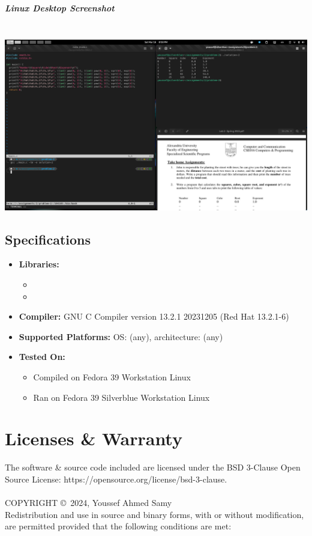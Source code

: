 \documentclass[a4paper,11pt]{article}
\theoremstyle{mytheor}
\theoremstyle{mytheor}
\begin{document}
\subparagraph{Linux Desktop Screenshot\\\\}
\includegraphics[width=1\linewidth,center]{desktop-2.png}
\newpage
\subsection{Specifications}
\begin{itemize}
    \item \textbf{Libraries:}
    \begin{itemize}
        \item \texttt{\color{inlinecode}{stdio.h}}
        \item \texttt{\color{inlinecode}{math.h}} 
    \end{itemize}
    \item \textbf{Compiler:} GNU C Compiler \texttt{\color{inlinecode}{(gcc)}} version 13.2.1 20231205 (Red Hat 13.2.1-6)
    \item \textbf{Supported Platforms:} OS: (any), architecture: (any)
    \item \textbf{Tested On:}
    \begin{itemize}
        \item Compiled on Fedora 39 Workstation Linux
        \item Ran on Fedora 39 Silverblue Workstation Linux
    \end{itemize}
\end{itemize}
\section{Licenses \& Warranty}
The software \& source code included are licensed under the BSD 3-Clause Open Source License: https://opensource.org/license/bsd-3-clause.\\\\
COPYRIGHT \copyright \ 2024, Youssef Ahmed Samy\\
Redistribution and use in source and binary forms, with or without modification, are permitted provided that the following conditions are met:
\end{document}
